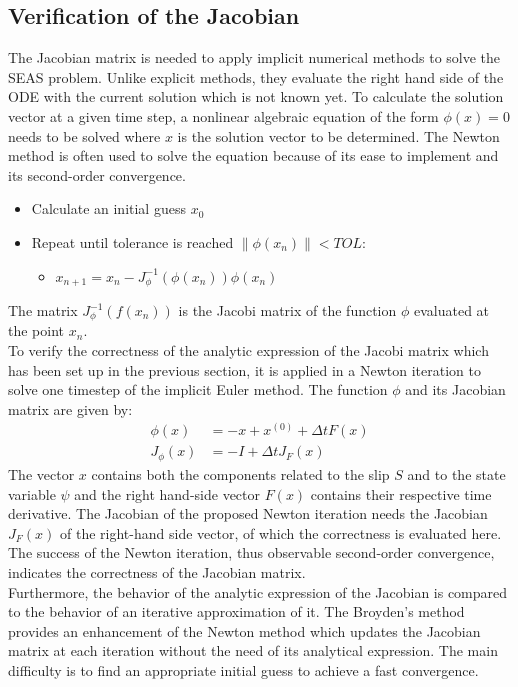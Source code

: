 \documentclass{report}
\begin{document}
\subsection{Verification of the Jacobian}
The Jacobian matrix is needed to apply implicit numerical methods to solve the SEAS problem. Unlike explicit methods, they evaluate the right hand side of the ODE with the current solution which is not known yet. To calculate the solution vector at a given time step, a nonlinear algebraic equation of the form $\phi(x) = 0$ needs to be solved where $x$ is the solution vector to be determined. The Newton method is often used to solve the equation because of its ease to implement and its second-order convergence. 

\begin{itemize}
	\item Calculate an initial guess $x_0$
	\item Repeat until tolerance is reached $\|\phi(x_n)\| < TOL$: 
	\begin{itemize}
		\item $x_{n+1} = x_n - J_\phi^{-1}(\phi(x_n)) \phi(x_n)$
	\end{itemize} 
\end{itemize}

The matrix $J_\phi^{-1}(f(x_n))$ is the Jacobi matrix of the function $\phi$ evaluated at the point $x_n$. \\
To verify the correctness of the analytic expression of the Jacobi matrix which has been set up in the previous section, it is applied in a Newton iteration to solve one timestep of the implicit Euler method. The function $\phi$ and its Jacobian matrix are given by: 
\begin{align}
	\phi(x) &= -x + x^{(0)} + \Delta t F(x) \\
	J_\phi(x) &= -I + \Delta t J_F(x)
\end{align}
The vector $x$ contains both the components related to the slip $S$ and to the state variable $\psi$ and the right hand-side vector $F(x)$ contains their respective time derivative. The Jacobian of the proposed Newton iteration needs the Jacobian $J_F(x)$ of the right-hand side vector, of which the correctness is evaluated here. The success of the Newton iteration, thus observable second-order convergence, indicates the correctness of the Jacobian matrix. \\
Furthermore, the behavior of the analytic expression of the Jacobian is compared to the behavior of an iterative approximation of it. The Broyden's method \cite{BroydenIteration} provides an enhancement of the Newton method which updates the Jacobian matrix at each iteration without the need of its analytical expression. The main difficulty is to find an appropriate initial guess to achieve a fast convergence. 
\end{document}
